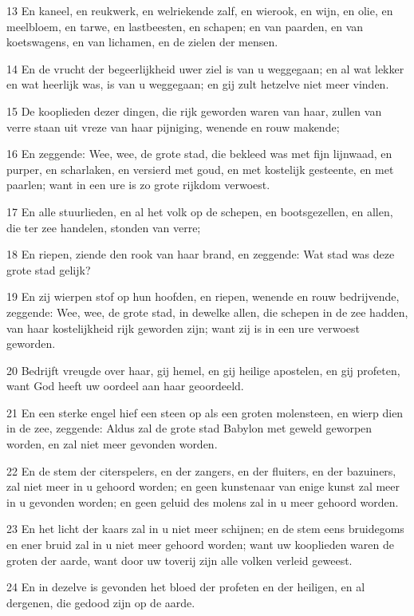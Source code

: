 \par 13 En kaneel, en reukwerk, en welriekende zalf, en wierook, en wijn, en olie, en meelbloem, en tarwe, en lastbeesten, en schapen; en van paarden, en van koetswagens, en van lichamen, en de zielen der mensen.
\par 14 En de vrucht der begeerlijkheid uwer ziel is van u weggegaan; en al wat lekker en wat heerlijk was, is van u weggegaan; en gij zult hetzelve niet meer vinden.
\par 15 De kooplieden dezer dingen, die rijk geworden waren van haar, zullen van verre staan uit vreze van haar pijniging, wenende en rouw makende;
\par 16 En zeggende: Wee, wee, de grote stad, die bekleed was met fijn lijnwaad, en purper, en scharlaken, en versierd met goud, en met kostelijk gesteente, en met paarlen; want in een ure is zo grote rijkdom verwoest.
\par 17 En alle stuurlieden, en al het volk op de schepen, en bootsgezellen, en allen, die ter zee handelen, stonden van verre;
\par 18 En riepen, ziende den rook van haar brand, en zeggende: Wat stad was deze grote stad gelijk?
\par 19 En zij wierpen stof op hun hoofden, en riepen, wenende en rouw bedrijvende, zeggende: Wee, wee, de grote stad, in dewelke allen, die schepen in de zee hadden, van haar kostelijkheid rijk geworden zijn; want zij is in een ure verwoest geworden.
\par 20 Bedrijft vreugde over haar, gij hemel, en gij heilige apostelen, en gij profeten, want God heeft uw oordeel aan haar geoordeeld.
\par 21 En een sterke engel hief een steen op als een groten molensteen, en wierp dien in de zee, zeggende: Aldus zal de grote stad Babylon met geweld geworpen worden, en zal niet meer gevonden worden.
\par 22 En de stem der citerspelers, en der zangers, en der fluiters, en der bazuiners, zal niet meer in u gehoord worden; en geen kunstenaar van enige kunst zal meer in u gevonden worden; en geen geluid des molens zal in u meer gehoord worden.
\par 23 En het licht der kaars zal in u niet meer schijnen; en de stem eens bruidegoms en ener bruid zal in u niet meer gehoord worden; want uw kooplieden waren de groten der aarde, want door uw toverij zijn alle volken verleid geweest.
\par 24 En in dezelve is gevonden het bloed der profeten en der heiligen, en al dergenen, die gedood zijn op de aarde.

